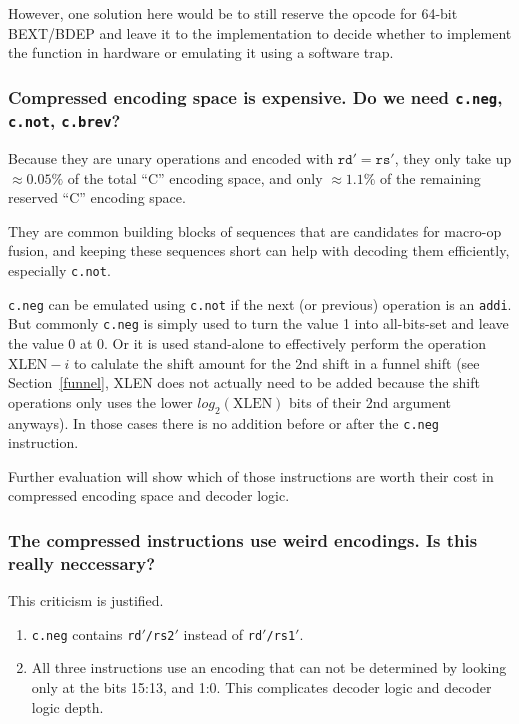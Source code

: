 However, one solution here would be to still reserve the opcode for 64-bit
BEXT/BDEP and leave it to the implementation to decide whether to implement the
function in hardware or emulating it using a software trap.

\subsubsection{Compressed encoding space is expensive. Do we need {\tt c.neg}, {\tt c.not}, {\tt c.brev}?}

Because they are unary operations and encoded with $\texttt{rd}' = \texttt{rs}'$, they only take
up $\approx 0.05\%$ of the total ``C'' encoding space, and only $\approx 1.1\%$
of the remaining reserved ``C'' encoding space.

They are common building blocks of sequences that are candidates for macro-op fusion,
and keeping these sequences short can help with decoding them efficiently, especially
{\tt c.not}.

{\tt c.neg} can be emulated using {\tt c.not} if the next (or previous) operation
is an {\tt addi}. But commonly {\tt c.neg} is simply used to turn the value 1
into all-bits-set and leave the value 0 at 0. Or it is used stand-alone to
effectively perform the operation $\textrm{XLEN}-i$ to calulate the shift
amount for the 2nd shift in a funnel shift (see Section~\ref{funnel}, XLEN does
not actually need to be added because the shift operations only uses the lower
$log_2(\textrm{XLEN})$ bits of their 2nd argument anyways). In those cases
there is no addition before or after the {\tt c.neg} instruction.

Further evaluation will show which of those instructions are worth their cost
in compressed encoding space and decoder logic.

\subsubsection{The compressed instructions use weird encodings. Is this really neccessary?}

This criticism is justified.

\begin{enumerate}
\item {\tt c.neg} contains {\tt rd$'$/rs2$'$} instead of {\tt rd$'$/rs1$'$}.

\item All three instructions use an encoding that can not be determined by looking
only at the bits 15:13, and 1:0. This complicates decoder logic and decoder
logic depth.
\end{enumerate}

